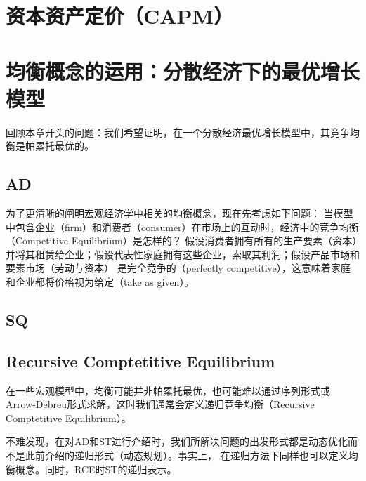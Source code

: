 \section{资本资产定价（CAPM）}




\section{均衡概念的运用：分散经济下的最优增长模型}

回顾本章开头的问题：我们希望证明，在一个分散经济最优增长模型中，其竞争均衡是帕累托最优的。



\subsection{AD}

为了更清晰的阐明宏观经济学中相关的均衡概念，现在先考虑如下问题：
当模型中包含企业（firm）和消费者（consumer）在市场上的互动时，经济中的竞争均衡（Competitive Equilibrium）是怎样的？
假设消费者拥有所有的生产要素（资本）并将其租赁给企业；假设代表性家庭拥有这些企业，索取其利润；假设产品市场和要素市场（劳动与资本）
是完全竞争的（perfectly competitive），这意味着家庭和企业都将价格视为给定（take as given）。


\subsection{SQ}


\subsection{Recursive Comptetitive Equilibrium}

在一些宏观模型中，均衡可能并非帕累托最优，也可能难以通过序列形式或Arrow-Debreu形式求解，这时我们通常会定义递归竞争均衡（Recursive Comptetitive Equilibrium）。

不难发现，在对AD和ST进行介绍时，我们所解决问题的出发形式都是动态优化而不是此前介绍的递归形式（动态规划）。事实上，
在递归方法下同样也可以定义均衡概念。同时，RCE时ST的递归表示。






